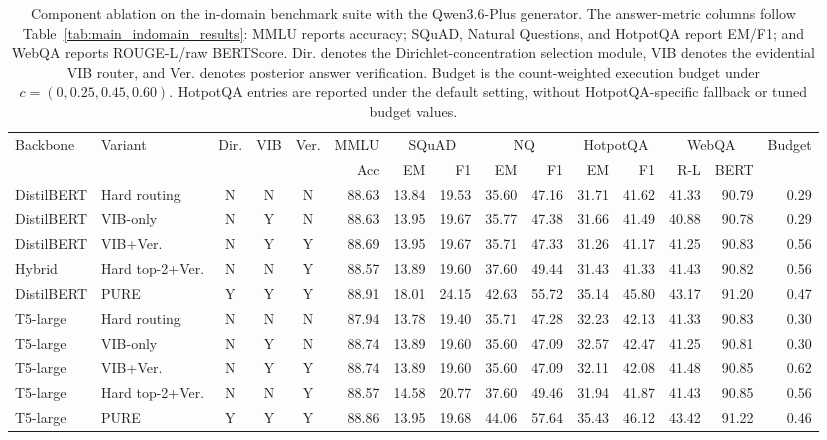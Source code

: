 \documentclass[a4paper,fleqn]{cas-dc}
\begin{document}
\begin{table}[t]
\centering
\scriptsize
\setlength{\tabcolsep}{2.0pt}
\caption[Component ablation]{Component ablation on the in-domain benchmark suite with the Qwen3.6-Plus generator. The answer-metric columns follow Table~\ref{tab:main_indomain_results}: MMLU reports accuracy; SQuAD, Natural Questions, and HotpotQA report EM/F1; and WebQA reports ROUGE-L/raw BERTScore. Dir. denotes the Dirichlet-concentration selection module, VIB denotes the evidential VIB router, and Ver. denotes posterior answer verification. Budget is the count-weighted execution budget under $c=(0,0.25,0.45,0.60)$. HotpotQA entries are reported under the default setting, without HotpotQA-specific fallback or tuned budget values.}
\label{tab:ablation_components}
\begin{tabular*}{\textwidth}{@{\extracolsep{\fill}}llcccrrrrrrrrrr@{}}
\toprule
Backbone & Variant & Dir. & VIB & Ver. & MMLU & \multicolumn{2}{c}{SQuAD} & \multicolumn{2}{c}{NQ} & \multicolumn{2}{c}{HotpotQA} & \multicolumn{2}{c}{WebQA} & Budget \\
\cmidrule(lr){6-6}\cmidrule(lr){7-8}\cmidrule(lr){9-10}\cmidrule(lr){11-12}\cmidrule(lr){13-14}\cmidrule(lr){15-15}
 & & & & & Acc & EM & F1 & EM & F1 & EM & F1 & R-L & BERT & \\
\midrule
DistilBERT & Hard routing & N & N & N & 88.63 & 13.84 & 19.53 & 35.60 & 47.16 & 31.71 & 41.62 & 41.33 & 90.79 & 0.29 \\
DistilBERT & VIB-only & N & Y & N & 88.63 & 13.95 & 19.67 & 35.77 & 47.38 & 31.66 & 41.49 & 40.88 & 90.78 & 0.29 \\
DistilBERT & VIB+Ver. & N & Y & Y & 88.69 & 13.95 & 19.67 & 35.71 & 47.33 & 31.26 & 41.17 & 41.25 & 90.83 & 0.56 \\
Hybrid & Hard top-2+Ver. & N & N & Y & 88.57 & 13.89 & 19.60 & 37.60 & 49.44 & 31.43 & 41.33 & 41.43 & 90.82 & 0.56 \\
DistilBERT & PURE & Y & Y & Y & 88.91 & 18.01 & 24.15 & 42.63 & 55.72 & 35.14 & 45.80 & 43.17 & 91.20 & 0.47 \\
\midrule
T5-large & Hard routing & N & N & N & 87.94 & 13.78 & 19.40 & 35.71 & 47.28 & 32.23 & 42.13 & 41.33 & 90.83 & 0.30 \\
T5-large & VIB-only & N & Y & N & 88.74 & 13.89 & 19.60 & 35.60 & 47.09 & 32.57 & 42.47 & 41.25 & 90.81 & 0.30 \\
T5-large & VIB+Ver. & N & Y & Y & 88.74 & 13.89 & 19.60 & 35.60 & 47.09 & 32.11 & 42.08 & 41.48 & 90.85 & 0.62 \\
T5-large & Hard top-2+Ver. & N & N & Y & 88.57 & 14.58 & 20.77 & 37.60 & 49.46 & 31.94 & 41.87 & 41.43 & 90.85 & 0.56 \\
T5-large & PURE & Y & Y & Y & 88.86 & 13.95 & 19.68 & 44.06 & 57.64 & 35.43 & 46.12 & 43.42 & 91.22 & 0.46 \\
\bottomrule
\end{tabular*}
\end{table}
\end{document}
